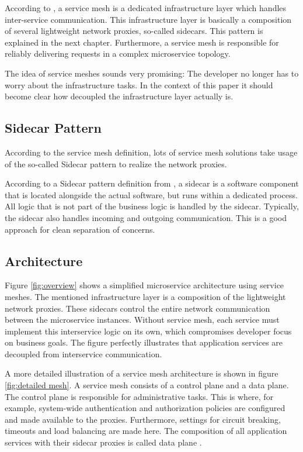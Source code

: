 According to \cite{sm1}, a service mesh is a dedicated infrastructure layer which handles inter-service communication. This infrastructure layer is basically a composition of several lightweight network proxies, so-called sidecars. This pattern is explained in the next chapter.  Furthermore, a service mesh is responsible for reliably delivering requests in a complex microservice topology.

The idea of service meshes sounds very promising: The developer no longer has to worry about the infrastructure tasks. In the context of this paper it should become clear how decoupled the infrastructure layer actually is.

\subsection{Sidecar Pattern}

According to the service mesh definition, lots of service mesh solutions take usage of the so-called Sidecar pattern to realize the network proxies.

According to a Sidecar pattern definition from \cite{sm3}, a sidecar is a software component that is located alongside the actual software, but runs within a dedicated process. All logic that is not part of the business logic is handled by the sidecar. Typically, the sidecar also handles incoming and outgoing communication. This is a good approach for clean separation of concerns.

\subsection{Architecture}
\label{chap:mesh-architecture}

Figure \ref{fig:overview} shows a simplified microservice architecture using service meshes. The mentioned infrastructure layer is a composition of the lightweight network proxies. These sidecars control the entire network communication between the microservice instances. Without service mesh, each service must implement this interservice logic on its own, which compromises developer focus on business goals. The figure perfectly illustrates that application services are decoupled from interservice communication.

A more detailed illustration of a service mesh architecture is shown in figure \ref{fig:detailed mesh}. A service mesh consists of a control plane and a data plane.
The control plane is responsible for administrative tasks. This is where, for example, system-wide authentication and authorization policies are configured and made available to the proxies. Furthermore, settings for circuit breaking, timeouts and load balancing are made here. The composition of all application services with their sidecar proxies is called data plane \cite{sm4}.

